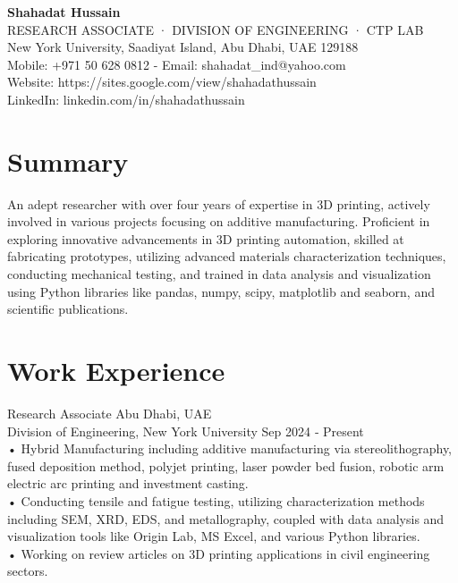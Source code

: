 \documentclass[a4paper]{article}
\begin{document}
\begin{center}

\textbf{\LARGE Shahadat Hussain}\\

RESEARCH ASSOCIATE · DIVISION OF ENGINEERING · CTP LAB\\
New York University, Saadiyat Island, Abu Dhabi, UAE 129188\\

Mobile: +971 50 628 0812 - Email: shahadat\_ind@yahoo.com\\
Website: https://sites.google.com/view/shahadathussain\\
LinkedIn: linkedin.com/in/shahadathussain\\

\end{center}

\section*{Summary}
An adept researcher with over four years of expertise in 3D printing, actively involved in various projects focusing on additive
manufacturing. Proficient in exploring innovative advancements in 3D printing automation, skilled at fabricating
prototypes, utilizing advanced materials characterization techniques, conducting mechanical testing, and trained in
data analysis and visualization using Python libraries like pandas, numpy, scipy, matplotlib and seaborn, and scientific
publications.\\

\section*{Work Experience}
Research Associate Abu Dhabi, UAE\\
Division of Engineering, New York University Sep 2024 ‑ Present\\
• Hybrid Manufacturing including additive manufacturing via stereolithography, fused deposition method, polyjet
printing, laser powder bed fusion, robotic arm electric arc printing and investment casting.\\
• Conducting tensile and fatigue testing, utilizing characterization methods including SEM, XRD, EDS, and metallography,
coupled with data analysis and visualization tools like Origin Lab, MS Excel, and various Python libraries.\\
• Working on review articles on 3D printing applications in civil engineering sectors.\\
\end{document}

